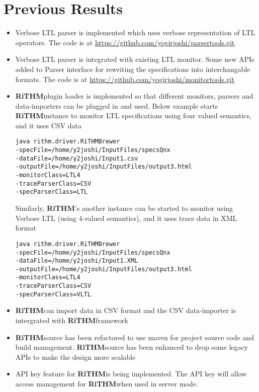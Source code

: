 \documentclass[]{article}
\newcommand{\rithm}{\textbf{RiTHM}\space}
\begin{document}
\section{Previous Results}
\begin{itemize}
\item
Verbose LTL parser is implemented which uses verbose representation of LTL operators. \newline
The code is at \url{https://github.com/yogirjoshi/parsertools.git}.

\item
Verbose LTL parser is integrated with existing LTL monitor. Some new APIs added to Parser interface for rewriting the specifications into interchangable formats. The code is at \url{https://github.com/yogirjoshi/monitortools.git}

\item
\rithm plugin loader is implemented so that different monitors, parsers and data-importers can be plugged in and used. \newline
Below example starts \rithm instance to monitor LTL specifications using four valued semantics, and it uses CSV data
\begin{lstlisting}
java rithm.driver.RiTHMBrewer 
-specFile=/home/y2joshi/InputFiles/specsQnx 
-dataFile=/home/y2joshi/Input1.csv
-outputFile=/home/y2joshi/InputFiles/output3.html 
-monitorClass=LTL4 
-traceParserClass=CSV 
-specParserClass=LTL
\end{lstlisting}
Similarly, \rithm's another instance can be started to monitor using Verbose LTL (using 4-valued semantics), and it uses trace data in XML format 
\begin{lstlisting}
java rithm.driver.RiTHMBrewer 
-specFile=/home/y2joshi/InputFiles/specsQnx 
-dataFile=/home/y2joshi/Input1.XML
-outputFile=/home/y2joshi/InputFiles/output3.html 
-monitorClass=LTL4 
-traceParserClass=CSV 
-specParserClass=VLTL
\end{lstlisting}


\item \rithm can import data in CSV format and the CSV data-importer is intergrated with \rithm framework

\item
\rithm source has been refactored to use maven for project source code and build management. \rithm source has been enhanced to drop some legacy APIs to make the design more scalable

\item API key feature for \rithm is being implemented. The API key will allow access management for \rithm when used in server mode.
\end{itemize}
\end{document}
